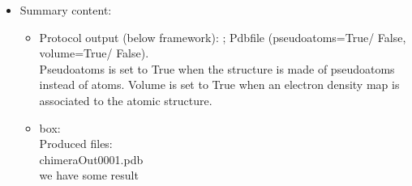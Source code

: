 \begin{itemize}
   \item Summary content:\\
    \begin{itemize}
     \item Protocol output (below \scipion framework): ; Pdbfile (pseudoatoms=True/ False, volume=True/ False).\\Pseudoatoms is set to True when the structure is made of pseudoatoms instead of atoms. Volume is set to True when an electron density map is associated to the atomic structure.\\
     \item {} box:\\Produced files:\\chimeraOut0001.pdb\\we have some result\\
    \end{itemize}
  
  \end{itemize}
